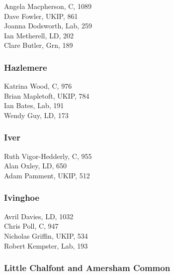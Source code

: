 \documentclass[a4paper,openany,10pt]{book}
\begin{document}
Angela Macpherson, C, 1089\\
Dave Fowler, UKIP, 861\\
Joanna Dodsworth, Lab, 259\\
Ian Metherell, LD, 202\\
Clare Butler, Grn, 189\\


\subsubsection*{Hazlemere}



Katrina Wood, C, 976\\
Brian Mapletoft, UKIP, 784\\
Ian Bates, Lab, 191\\
Wendy Guy, LD, 173\\


\subsubsection*{Iver}



Ruth Vigor-Hedderly, C, 955\\
Alan Oxley, LD, 650\\
Adam Pamment, UKIP, 512\\


\subsubsection*{Ivinghoe}



Avril Davies, LD, 1032\\
Chris Poll, C, 947\\
Nicholas Griffin, UKIP, 534\\
Robert Kempster, Lab, 193\\


\subsubsection*{Little Chalfont and Amersham Common}

\end{document}
